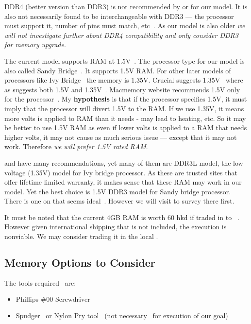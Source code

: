 DDR4 (better version than DDR3) is not recommended by \macsales or \crucial for our model. It is also not necessarily found to be interchangeable with DDR3 --- the processor must support it, number of pins must match, etc~\cite{quoraddr, suddr}. As our model is also older \emph{we will not investigate further about DDR4 compatibility and only consider DDR3 for memory upgrade}.

The current model supports RAM at 1.5V~\cite{wikimacpro,intelcoremoredet,ocprocessorguide}. The processor type for our model is also called Sandy Bridge~\cite{intelsandytypes}. It supports 1.5V RAM. For other later models of processors like Ivy Bridge~\cite{intelivytypes} the memory is 1.35V. Crucial suggests 1.35V~\cite{crucialramlist} where as \macsales suggests both 1.5V and 1.35V~\cite{macsalesramlist}. Macmemory website recommends 1.5V only for the processor~\cite{macmemramlist}. My \textbf{hypothesis} is that if the processor specifies 1.5V, it must imply that the processor will divert 1.5V to the RAM. If we use 1.35V, it means more volts is applied to RAM than it needs - may lead to heating, etc. So it may be better to use 1.5V RAM as even if lower volts is applied to a RAM that needs higher volts, it may not cause as much serious issue --- except that it may not work. Therefore \emph{we will prefer 1.5V rated RAM}.

\crucial and \macsales have many recommendations, yet many of them are DDR3L model, the low voltage (1.35V) model for Ivy bridge processor. As these are trusted sites that offer lifetime limited warranty, it makes sense that these RAM may work in our model. Yet the best choice is 1.5V DDR3 model for Sandy bridge processor. There is one on \macsales that seems ideal~\cite{macsalesramin}. However we will visit \market to survey there first.

It must be noted that the current 4GB RAM is worth 60 hkd if traded in to {\macsales}~\cite{owcmemrebate}. However given international shipping that is not included, the execution is nonviable. We may consider trading it in the local \market.


\subsection{Memory Options to Consider}
\label{memoryOptions}

The tools required~\cite{ifixramreguide} are:

\begin{itemize}
\item Phillips \#00 Screwdriver~\cite{ifixphscd}
\item Spudger~\cite{ifixspud} or Nylon Pry tool~\cite{owcramreguide,owcpry} (not necessary~\cite{macrumourpry} for execution of our goal)
\end{itemize}

